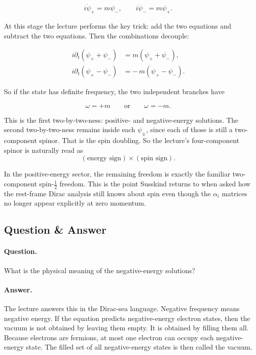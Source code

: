 \begin{equation}
i\dot{\psi}_+=m\psi_-,
\qquad
i\dot{\psi}_-=m\psi_+.
\end{equation}

At this stage the lecture performs the key trick: add the two equations and subtract the two equations. Then the combinations decouple:

\begin{align}
i\partial_t(\psi_+ + \psi_-)
&=
m(\psi_+ + \psi_-),\\
i\partial_t(\psi_+ - \psi_-)
&=
-\,m(\psi_+ - \psi_-).
\end{align}

So if the state has definite frequency, the two independent branches have

\begin{equation}
\omega=+m
\qquad \text{or} \qquad
\omega=-m.
\end{equation}

This is the first two-by-two-ness: positive- and negative-energy solutions. The second two-by-two-ness remains inside each \(\psi_\pm\), since each of those is still a two-component spinor. That is the spin doubling. So the lecture's four-component spinor is naturally read as
\[
(\text{energy sign}) \times (\text{spin sign}).
\]

In the positive-energy sector, the remaining freedom is exactly the familiar two-component spin-\(\tfrac12\) freedom. This is the point Susskind returns to when asked how the rest-frame Dirac analysis still knows about spin even though the \(\alpha_i\) matrices no longer appear explicitly at zero momentum.

\subsection{Question \& Answer}

\paragraph{Question.} What is the physical meaning of the negative-energy solutions?

\paragraph{Answer.} The lecture answers this in the Dirac-sea language. Negative frequency means negative energy. If the equation predicts negative-energy electron states, then the vacuum is not obtained by leaving them empty. It is obtained by filling them all. Because electrons are fermions, at most one electron can occupy each negative-energy state. The filled set of all negative-energy states is then called the vacuum.

